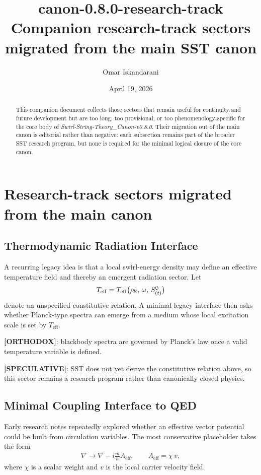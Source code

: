 \documentclass[11pt]{article}
\title{canon-0.8.0-research-track\\
\large Companion research-track sectors migrated from the main SST canon}
\author{Omar Iskandarani}
\date{April 19, 2026}
\newcommand{\swirlarrow}{\mathchoice{\mkern-2mu\scriptstyle\boldsymbol{\circlearrowleft}}{\mkern-2mu\scriptstyle\boldsymbol{\circlearrowleft}}{\mkern-2mu\scriptscriptstyle\boldsymbol{\circlearrowleft}}{\mkern-2mu\scriptscriptstyle\boldsymbol{\circlearrowleft}}}
\newcommand{\rhoE}{\rho_{\!E}}
\newcommand{\SwirlClock}{{S_{(t)}^{\swirlarrow}}}
\begin{document}
\maketitle

\begin{abstract}
This companion document collects those sectors that remain useful for continuity and future development but are too long, too provisional, or too phenomenology-specific for the core body of \textit{Swirl-String-Theory\_Canon-v0.8.0}. Their migration out of the main canon is editorial rather than negative: each subsection remains part of the broader SST research program, but none is required for the minimal logical closure of the core canon.
\end{abstract}

\section{Research-track sectors migrated from the main canon}

\subsection{Thermodynamic Radiation Interface}
A recurring legacy idea is that a local swirl-energy density may define an effective temperature field and thereby an emergent radiation sector. Let
\begin{align}
    T_{\mathrm{eff}} = T_{\mathrm{eff}}\big(\rhoE,\, \omega,\, \SwirlClock\big)
\end{align}
denote an unspecified constitutive relation. A minimal legacy interface then asks whether Planck-type spectra can emerge from a medium whose local excitation scale is set by $T_{\mathrm{eff}}$.

\textbf{[ORTHODOX]}: blackbody spectra are governed by Planck's law once a valid temperature variable is defined.

\textbf{[SPECULATIVE]}: SST does not yet derive the constitutive relation above, so this sector remains a research program rather than canonically closed physics.

\subsection{Minimal Coupling Interface to QED}
Early research notes repeatedly explored whether an effective vector potential could be built from circulation variables. The most conservative placeholder takes the form
\begin{align}
    \nabla \rightarrow \nabla - i\frac{m}{\hbar}A_{\mathrm{eff}},
    \qquad
    A_{\mathrm{eff}} = \chi \, v,
\end{align}
where $\chi$ is a scalar weight and $v$ is the local carrier velocity field.
\end{document}
